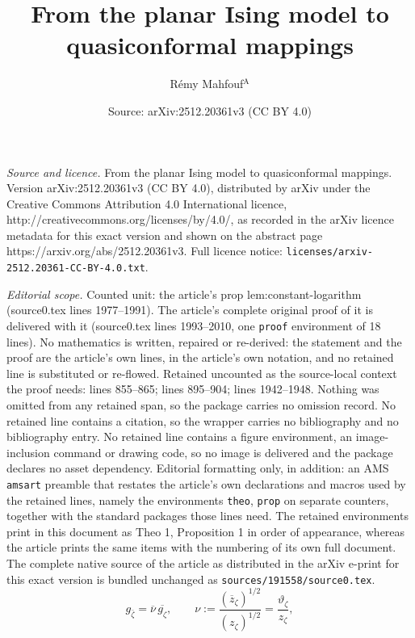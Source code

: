 \documentclass[10pt,a4paper]{amsart}
\title{From the planar Ising model to quasiconformal mappings}
\author{Rémy Mahfouf$^\mathrm{A}$}
\date{Source: arXiv:2512.20361v3 (CC BY 4.0)}
\begin{document}
\maketitle

\noindent\emph{Source and licence.} From the planar Ising model to quasiconformal mappings. Version arXiv:2512.20361v3 (CC BY 4.0), distributed by arXiv under the Creative Commons Attribution 4.0 International licence, http://creativecommons.org/licenses/by/4.0/, as recorded in the arXiv licence metadata for this exact version and shown on the abstract page https://arxiv.org/abs/2512.20361v3. Full licence notice: \texttt{licenses/arxiv-2512.20361-CC-BY-4.0.txt}.\par\smallskip

\noindent\textit{Editorial scope.} Counted unit: the article's prop lem:constant-logarithm (source0.tex lines 1977--1991). The article's complete original proof of it is delivered with it (source0.tex lines 1993--2010, one \texttt{proof} environment of 18 lines). No mathematics is written, repaired or re-derived: the statement and the proof are the article's own lines, in the article's own notation, and no retained line is substituted or re-flowed.  Retained uncounted as the source-local context the proof needs: lines 855--865; lines 895--904; lines 1942--1948.  Nothing was omitted from any retained span, so the package carries no omission record.  No retained line contains a citation, so the wrapper carries no bibliography and no bibliography entry.  No retained line contains a figure environment, an image-inclusion command or drawing code, so no image is delivered and the package declares no asset dependency.  Editorial formatting only, in addition: an AMS \texttt{amsart} preamble that restates the article's own declarations and macros used by the retained lines, namely the environments \texttt{theo}, \texttt{prop} on separate counters, together with the standard packages those lines need.  The retained environments print in this document as Theo 1, Proposition 1 in order of appearance, whereas the article prints the same items with the numbering of its own full document.  The complete native source of the article as distributed in the arXiv e-print for this exact version is bundled unchanged as \texttt{sources/191558/source0.tex}.
\begin{equation}\label{eq:g_beltrami}
g_{\bar\zeta}
=
\overline{\nu}\,\overline{g_\zeta},
\qquad
\nu
:=
\frac{(\overline z_\zeta)^{1/2}}{(z_\zeta)^{1/2}}
=
\frac{\vartheta_\zeta}{z_\zeta},
\end{equation}
\end{document}
